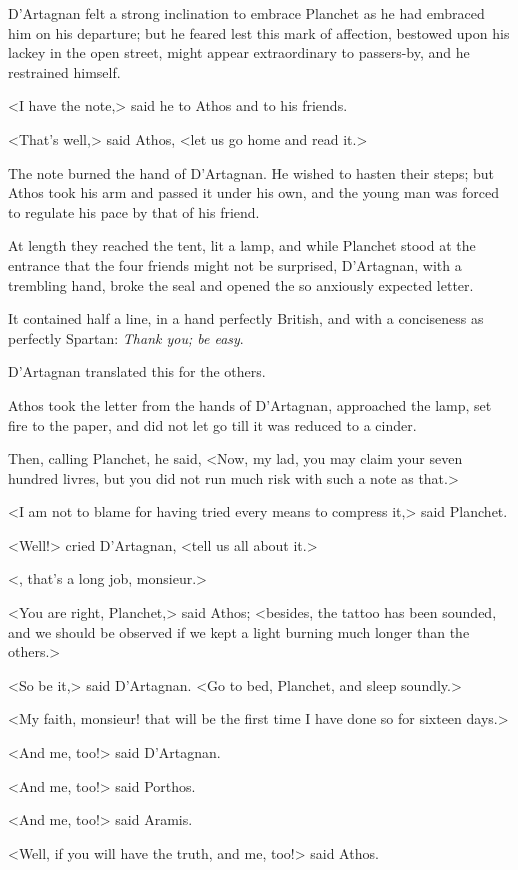 D'Artagnan felt a strong inclination to embrace Planchet as he had embraced him on his departure; but he feared lest this mark of affection, bestowed upon his lackey in the open street, might appear extraordinary to passers-by, and he restrained himself. 

<I have the note,> said he to Athos and to his friends. 

<That's well,> said Athos, <let us go home and read it.> 

The note burned the hand of D'Artagnan. He wished to hasten their steps; but Athos took his arm and passed it under his own, and the young man was forced to regulate his pace by that of his friend. 

At length they reached the tent, lit a lamp, and while Planchet stood at the entrance that the four friends might not be surprised, D'Artagnan, with a trembling hand, broke the seal and opened the so anxiously expected letter. 

It contained half a line, in a hand perfectly British, and with a conciseness as perfectly Spartan:  \textit{Thank you; be easy}. 

D'Artagnan translated this for the others. 

Athos took the letter from the hands of D'Artagnan, approached the lamp, set fire to the paper, and did not let go till it was reduced to a cinder. 

Then, calling Planchet, he said, <Now, my lad, you may claim your seven hundred livres, but you did not run much risk with such a note as that.> 

<I am not to blame for having tried every means to compress it,> said Planchet. 

<Well!> cried D'Artagnan, <tell us all about it.> 

<, that's a long job, monsieur.> 

<You are right, Planchet,> said Athos; <besides, the tattoo has been sounded, and we should be observed if we kept a light burning much longer than the others.> 

<So be it,> said D'Artagnan. <Go to bed, Planchet, and sleep soundly.> 

<My faith, monsieur! that will be the first time I have done so for sixteen days.> 

<And me, too!> said D'Artagnan. 

<And me, too!> said Porthos. 

<And me, too!> said Aramis. 

<Well, if you will have the truth, and me, too!> said Athos. 